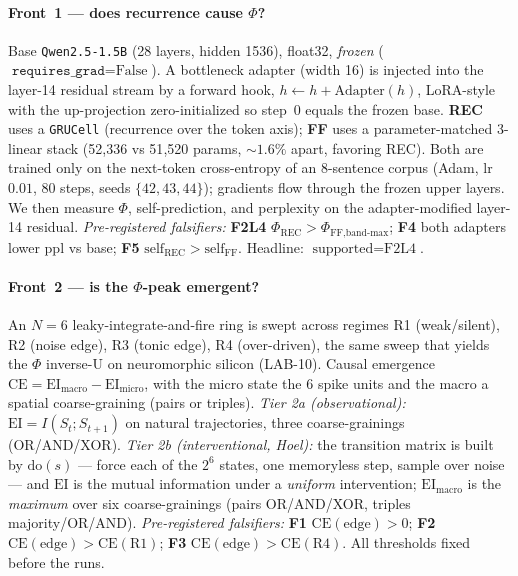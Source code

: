 \documentclass[11pt,a4paper]{article}
\begin{document}
\paragraph{Front~1 --- does recurrence cause $\Phi$?} Base
\texttt{Qwen2.5-1.5B} (28 layers, hidden 1536), float32, \emph{frozen}
($\texttt{requires\_grad}=\text{False}$). A bottleneck adapter (width 16) is
injected into the layer-14 residual stream by a forward hook,
$h \leftarrow h + \mathrm{Adapter}(h)$, LoRA-style with the up-projection
zero-initialized so step~0 equals the frozen base. \textbf{REC} uses a
\texttt{GRUCell} (recurrence over the token axis); \textbf{FF} uses a
parameter-matched 3-linear stack (52{,}336 vs 51{,}520 params, $\sim 1.6\%$ apart,
favoring REC). Both are trained only on the next-token cross-entropy of an
8-sentence corpus (Adam, lr $0.01$, 80 steps, seeds $\{42,43,44\}$); gradients
flow through the frozen upper layers. We then measure $\Phi$, self-prediction,
and perplexity on the adapter-modified layer-14 residual. \emph{Pre-registered
falsifiers:} \textbf{F2L4} $\Phi_{\text{REC}} > \Phi_{\text{FF,band-max}}$;
\textbf{F4} both adapters lower ppl vs base; \textbf{F5}
$\mathrm{self}_{\text{REC}} > \mathrm{self}_{\text{FF}}$. Headline:
$\text{supported}=\text{F2L4}$.

\paragraph{Front~2 --- is the $\Phi$-peak emergent?} An $N{=}6$
leaky-integrate-and-fire ring is swept across regimes R1 (weak/silent), R2
(noise edge), R3 (tonic edge), R4 (over-driven), the same sweep that yields the
$\Phi$ inverse-U on neuromorphic silicon (LAB-10). Causal emergence
$\mathrm{CE}=\mathrm{EI}_{\text{macro}}-\mathrm{EI}_{\text{micro}}$, with the
micro state the 6 spike units and the macro a spatial coarse-graining (pairs or
triples). \emph{Tier 2a (observational):} $\mathrm{EI}=I(S_t;S_{t+1})$ on natural
trajectories, three coarse-grainings (OR/AND/XOR). \emph{Tier 2b
(interventional, Hoel):} the transition matrix is built by $\mathrm{do}(s)$ ---
force each of the $2^6$ states, one memoryless step, sample over noise --- and
$\mathrm{EI}$ is the mutual information under a \emph{uniform} intervention;
$\mathrm{EI}_{\text{macro}}$ is the \emph{maximum} over six coarse-grainings
(pairs OR/AND/XOR, triples majority/OR/AND). \emph{Pre-registered falsifiers:}
\textbf{F1} $\mathrm{CE}(\text{edge}) > 0$; \textbf{F2} $\mathrm{CE}(\text{edge}) > \mathrm{CE}(\text{R1})$;
\textbf{F3} $\mathrm{CE}(\text{edge}) > \mathrm{CE}(\text{R4})$. All thresholds
fixed before the runs.
\end{document}
